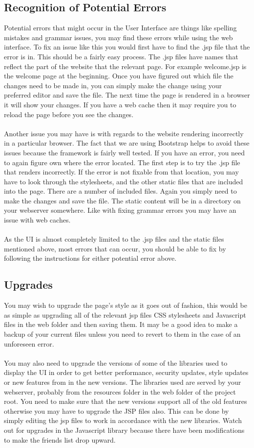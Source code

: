 \documentclass[titlepage]{article}
\begin{document}
{\subsection {Recognition of Potential Errors}
Potential errors that might occur in the User Interface are things like spelling mistakes and grammar issues, you may find these errors while using the web interface. To fix an issue like this you would first have to find the .jsp file that the error is in. This should be a fairly easy process. The .jsp files have names that reflect the part of the website that the relevant page. For example welcome.jsp is the welcome page at the beginning. Once you have figured out which file the changes need to be made in, you can simply make the change using your preferred editor and save the file. The next time the page is rendered in a browser it will show your changes. If you have a web cache then it may require you to reload the page before you see the changes.
\\
\\
Another issue you may have is with regards to the website rendering incorrectly in a particular browser. The fact that we are using Bootstrap helps to avoid these issues because the framework is fairly well tested. If you have an error, you need to again figure own where the error located. The first step is to try the .jsp file that renders incorrectly. If the error is not fixable from that location, you may have to look through the stylesheets, and the other static files that are included into the page. There are a number of included files. Again you simply need to make the changes and save the file. The static content will be in a directory on your webserver somewhere. Like with fixing grammar errors you may have an issue with web caches.
\\
\\
As the UI is almost completely limited to the .jsp files and the static files mentioned above, most errors that can occur, you should be able to fix by following the instructions for either potential error above.
\subsection {Upgrades}
You may wish to upgrade the page’s style as it goes out of fashion, this would be as simple as upgrading all of the relevant jsp files CSS stylesheets and Javascript files in the web folder and then saving them. It may be a good idea to make a backup of your current files unless you need to revert to them in the case of an unforeseen error.
\\
\\
You may also need to upgrade the versions of some of the libraries used to display the UI in order to get better performance, security updates, style updates or new features from in the new versions. The libraries used are served by your webserver, probably from the resources folder in the web folder of the project root. You need to make sure that the new versions support all of the old features otherwise you may have to upgrade the JSP files also. This can be done by simply editing the jsp files to work in accordance with the new libraries. Watch out for upgrades in the Javascript library because there have been modifications to make the friends list drop upward.
}
\end{document}
